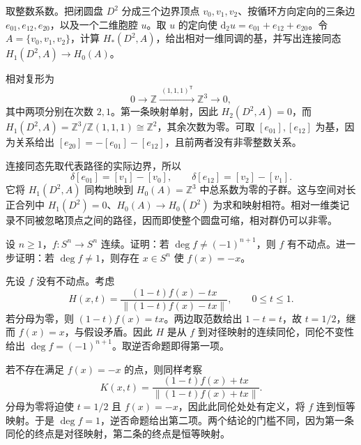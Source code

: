 \begin{exercise}\label{g2:ex:disk-relative-three-points}
	取整数系数。把闭圆盘 \(D^2\) 分成三个边界顶点 \(v_0,v_1,v_2\)、按循环方向定向的三条边 \(e_{01},e_{12},e_{20}\)，以及一个二维胞腔 \(u\)。取 \(u\) 的定向使 \(\mathrm{d}_2u=e_{01}+e_{12}+e_{20}\)。令 \(A=\{v_0,v_1,v_2\}\)，计算 \(H_*(D^2,A)\)，给出相对一维同调的基，并写出连接同态 \(H_1(D^2,A)\to H_0(A)\)。
\end{exercise}
\begin{solution}
	相对复形为
	\[
		0\longrightarrow\mathbb Z\xrightarrow{\ (1,1,1)^{\mathsf T}\ }\mathbb Z^3\longrightarrow0,
	\]
	其中两项分别在次数 \(2,1\)。第一条映射单射，因此 \(H_2(D^2,A)=0\)，而 \(H_1(D^2,A)=\mathbb Z^3/\mathbb Z(1,1,1)\cong\mathbb Z^2\)，其余次数为零。可取 \([e_{01}],[e_{12}]\) 为基，因为关系给出 \([e_{20}]=-[e_{01}]-[e_{12}]\)，且前两者没有非零整数关系。

	连接同态先取代表路径的实际边界，所以
	\[
		\delta[e_{01}]=[v_1]-[v_0],\qquad
		\delta[e_{12}]=[v_2]-[v_1].
	\]
	它将 \(H_1(D^2,A)\) 同构地映到 \(H_0(A)=\mathbb Z^3\) 中总系数为零的子群。这与空间对长正合列中 \(H_1(D^2)=0\)、\(H_0(A)\to H_0(D^2)\) 为求和映射相符。相对一维类记录不同被忽略顶点之间的路径，因而即使整个圆盘可缩，相对群仍可以非零。
\end{solution}

\begin{exercise}\label{g2:ex:degree-fixed-point}
	设 \(n\ge1\)，\(f:S^n\rightarrow S^n\) 连续。证明：若 \(\deg f\ne(-1)^{n+1}\)，则 \(f\) 有不动点。进一步证明：若 \(\deg f\ne1\)，则存在 \(x\in S^n\) 使 \(f(x)=-x\)。
\end{exercise}
\begin{solution}
	先设 \(f\) 没有不动点。考虑
	\[
		H(x,t)=\frac{(1-t)f(x)-tx}{\|(1-t)f(x)-tx\|},\qquad 0\le t\le1.
	\]
	若分母为零，则 \((1-t)f(x)=tx\)。两边取范数给出 \(1-t=t\)，故 \(t=1/2\)，继而 \(f(x)=x\)，与假设矛盾。因此 \(H\) 是从 \(f\) 到对径映射的连续同伦，同伦不变性给出 \(\deg f=(-1)^{n+1}\)。取逆否命题即得第一项。

	若不存在满足 \(f(x)=-x\) 的点，则同样考察
	\[
		K(x,t)=\frac{(1-t)f(x)+tx}{\|(1-t)f(x)+tx\|}.
	\]
	分母为零将迫使 \(t=1/2\) 且 \(f(x)=-x\)，因此此同伦处处有定义，将 \(f\) 连到恒等映射。于是 \(\deg f=1\)，逆否命题给出第二项。两个结论的门槛不同，因为第一条同伦的终点是对径映射，第二条的终点是恒等映射。
\end{solution}

